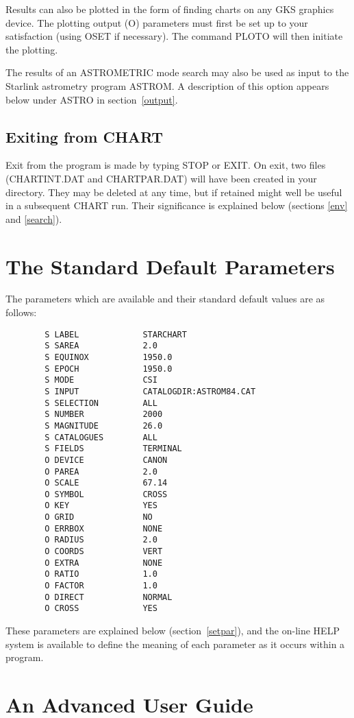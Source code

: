 Results can also be plotted in the form of finding charts on any GKS graphics
device.
The plotting output (O) parameters must first be set up to your satisfaction
(using OSET if necessary).
The command PLOTO will then initiate the plotting.

The results of an ASTROMETRIC mode search may also be used as input to the
Starlink astrometry program ASTROM.
A description of this option appears below under ASTRO in section~\ref{output}.
\subsection{Exiting from CHART}
Exit from the program is made by typing STOP or EXIT.
On exit, two files (CHARTINT.DAT and CHARTPAR.DAT) will have been created in
your directory.
They may be deleted at any time, but if retained might well be useful in a
subsequent CHART run.
Their significance is explained below (sections \ref{env} and \ref{search}).
\section{The Standard Default Parameters}
\label{defpar}
The parameters which are available and their standard default values are as
follows:
\begin{verbatim}
        S LABEL             STARCHART
        S SAREA             2.0
        S EQUINOX           1950.0
        S EPOCH             1950.0
        S MODE              CSI
        S INPUT             CATALOGDIR:ASTROM84.CAT
        S SELECTION         ALL
        S NUMBER            2000
        S MAGNITUDE         26.0
        S CATALOGUES        ALL
        S FIELDS            TERMINAL
        O DEVICE            CANON
        O PAREA             2.0
        O SCALE             67.14
        O SYMBOL            CROSS
        O KEY               YES
        O GRID              NO
        O ERRBOX            NONE
        O RADIUS            2.0
        O COORDS            VERT
        O EXTRA             NONE
        O RATIO             1.0
        O FACTOR            1.0
        O DIRECT            NORMAL
        O CROSS             YES

\end{verbatim}
These parameters are explained below (section~\ref{setpar}), and the on-line 
HELP system is available to define the meaning of each parameter as it occurs
within a program. 

\section{An Advanced User Guide}
